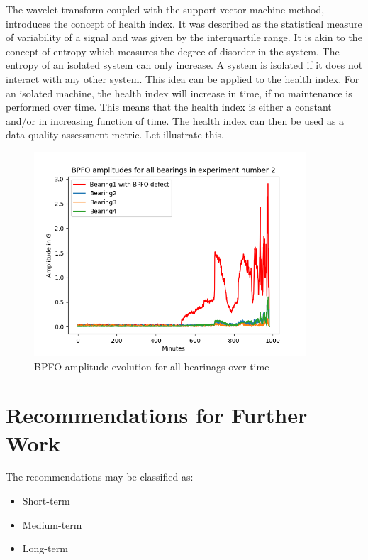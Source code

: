 \documentclass[thesis.tex]{subfiles}
\begin{document}
	\justify
	The wavelet transform coupled with the support vector machine method, introduces the concept of health index. It was described as the statistical measure of variability of a signal and was given by the interquartile range. It is akin to the concept of entropy which measures the degree of disorder in the system. The entropy of an isolated system can only increase. A system is isolated if it does not interact with any other system. This idea can be applied to the health index. For an isolated machine, the health index will increase in time, if no maintenance is performed over time. This means that the health index is either a constant and/or in increasing function of time. The health index can then be used as a data quality assessment metric. Let illustrate this.
	\begin{figure}[H] 
		\centering
		\includegraphics[width=4in]{../fig/experiment2_bearing_fft_amp.png}
		\caption{BPFO amplitude evolution for all bearinags over time}
		\label{fig:dq1}
	\end{figure}
	\section{Recommendations for Further Work}
	\label{sec:recommendations_for_further_work}
	
	
	The recommendations may be classified as:
	\begin{itemize}
		\item Short-term
		\item Medium-term
		\item Long-term
	\end{itemize}
	
\end{document}

